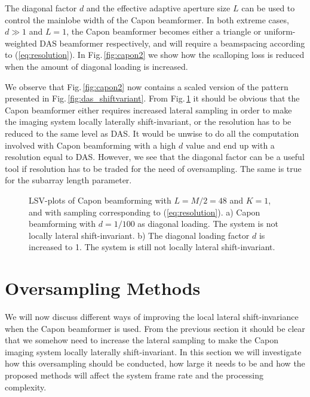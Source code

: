 \documentclass[journal]{IEEEtran}
\newcommand{\img}{img/}
\begin{document}
The diagonal factor $d$ and the effective adaptive aperture size $L$ can be used to control the mainlobe width of the Capon beamformer. In both extreme cases, $d\gg1$ and $L=1$, the Capon beamformer becomes either a triangle or uniform-weighted DAS beamformer respectively, and will require a beamspacing according to (\ref{eq:resolution}). In Fig.\,\ref{fig:capon2} we show how the scalloping loss is reduced when the amount of diagonal loading is increased. 

We observe that Fig.\,\ref{fig:capon2} now contains a scaled version of the pattern presented in Fig.\,\ref{fig:das_shiftvariant}. From Fig.\,\ref{fig:capon} it should be obvious that the Capon beamformer either requires increased lateral sampling in order to make the imaging system locally laterally shift-invariant, or the resolution has to be reduced to the same level as DAS. It would be unwise to do all the computation involved with Capon beamforming with a high $d$ value and end up with a resolution equal to DAS. However, we see that the diagonal factor can be a useful tool if resolution has to be traded for the need of oversampling. The same is true for the subarray length parameter.

\begin{figure}[!t]
\centerline{
}
\caption{LSV-plots of Capon beamforming with $L=M/2=48$ and $K=1$, and with sampling corresponding to (\ref{eq:resolution}). a) Capon beamforming with $d=1/100$ as diagonal loading. The system is not locally lateral shift-invariant. b) The diagonal loading factor $d$ is increased to 1. The system is still not locally lateral shift-invariant.}
\label{fig:capon}
\end{figure}

\section{Oversampling Methods}\label{sec:methods}
We will now discuss different ways of improving the local lateral shift-invariance when the Capon beamformer is used. From the previous section it should be clear that we somehow need to increase the lateral sampling to make the Capon imaging system locally laterally shift-invariant. In this section we will investigate how this oversampling should be conducted, how large it needs to be and how the proposed methods will affect the system frame rate and the processing complexity.
\end{document}
